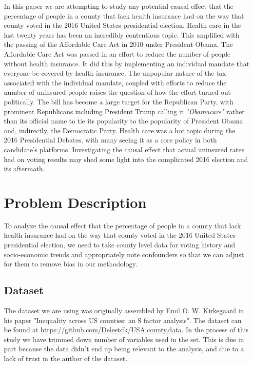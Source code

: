\documentclass[11pt, conference,compsoc]{IEEEtran}
\begin{document}
In this paper we are attempting to study any potential causal effect that the percentage of people in a county that lack health insurance had on the way that county voted in the 2016 United States presidential election. Health care in the last twenty years has been an incredibly contentious topic. This amplified with the passing of the Affordable Care Act in 2010 under President Obama. The Affordable Care Act was passed in an effort to reduce the number of people without health insurance. It did this by implementing an individual mandate that everyone be covered by health insurance. The unpopular nature of the tax associated with the individual mandate, coupled with efforts to reduce the number of uninsured people raises the question of how the effort turned out politically. The bill has become a large target for the Republican Party, with prominent Republicans including President Trump calling it \textit{"Obamacare"} rather than its official name to tie its popularity to the popularity of President Obama and, indirectly, the Democratic Party. Health care was a hot topic during the 2016 Presidential Debates, with many seeing it as a core policy in both candidate's platforms. Investigating the causal effect that actual uninsured rates had on voting results may shed some light into the complicated 2016 election and its aftermath.

\section{Problem Description}
To analyze the causal effect that the percentage of people in a county that lack health insurance had on the way that county voted in the 2016 United States presidential election, we need to take county level data for voting history and socio-economic trends and appropriately note confounders so that we can adjust for them to remove bias in our methodology. 

\subsection{Dataset}
The dataset we are using was originally assembled by Emil O. W. Kirkegaard in his paper "Inequality across US counties: an S factor analysis". The dataset can be found at \url{https://github.com/Deleetdk/USA.county.data}. In the process of this study we have trimmed down number of variables used in the set. This is due in part because the data didn't end up being relevant to the analysis, and due to a lack of trust in the author of the dataset. 
\end{document}
